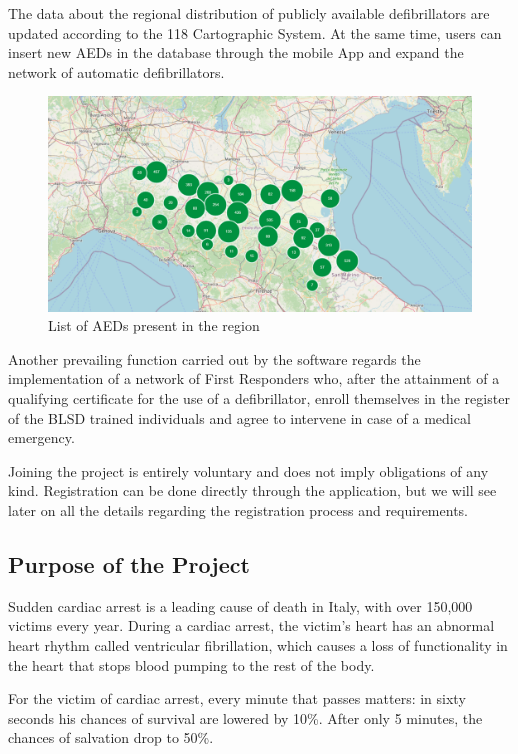 \documentclass[11pt,a4paper]{article}
\begin{document}
The data about the regional distribution of publicly available defibrillators are updated according to the 118 Cartographic System.
%
At the same time, users can insert new AEDs in the database through the mobile App and expand the network of automatic defibrillators.

\begin{figure}
    \centering
    \includegraphics[width=\textwidth]{images/map.png}
    \caption{List of AEDs present in the region}
    \label{fig:DAE-map}
\end{figure}

Another prevailing function carried out by the software regards the implementation of a network of First Responders who, after the attainment of a qualifying certificate for the use of a defibrillator, enroll themselves in the register of the BLSD trained individuals and agree to intervene in case of a medical emergency.

Joining the project is entirely voluntary and does not imply obligations of any kind.
%
Registration can be done directly through the application, but we will see later on all the details regarding the registration process and requirements.

\subsection{Purpose of the Project}
Sudden cardiac arrest is a leading cause of death in Italy, with over 150,000 victims every year.
%
During a cardiac arrest, the victim's heart has an abnormal heart rhythm called ventricular fibrillation, which causes a loss of functionality in the heart that stops blood pumping to the rest of the body.

For the victim of cardiac arrest, every minute that passes matters: in sixty seconds  his chances of survival are lowered by 10\%. After only 5 minutes, the chances of salvation drop to 50\%.
\end{document}
